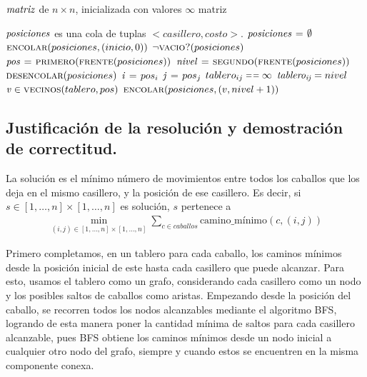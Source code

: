 \vspace*{0.3cm}


\begin{codebox}
\li \Comment $\id{matriz}$ de $n \times n$, inicializada con valores $\infty$
\li \Return matriz
\end{codebox}


\vspace*{0.3cm}


\begin{codebox}
\li \Comment $\id{posiciones}$ es una cola de tuplas $<casillero,costo>$.
\li $\id{posiciones} \gets \emptyset$
\li $\textnormal{\scshape encolar}(posiciones, (inicio,0))$
\li \While $\lnot \textnormal{\scshape vacio?}(posiciones)$ \Do
\li   $\id{pos} \gets \proc{primero}(\proc{frente}(posiciones))$
\li   $\id{nivel} \gets \proc{segundo}(\proc{frente}(posiciones))$
\li   $\textnormal{\scshape desencolar}(posiciones)$
\li   $\id{i} \gets pos_i$
\li   $\id{j} \gets pos_j$
\li   \If $tablero_{ij} \isequal \infty$ \Then
\li     $\id{tablero_{ij}} = nivel$
\li     \For $\id{v} \in \proc{vecinos}(tablero,pos)$ \Do
\li       $\textnormal{\scshape encolar}(posiciones,(v,nivel + 1))$
        \End
      \End
    \End
\end{codebox}



\newpage
\subsection{Justificación de la resolución y demostración de correctitud.}

\vspace*{0.3cm}

La solución es el mínimo número de movimientos entre todos los caballos que
los deja en el mismo casillero, y la posición de ese casillero. Es decir, si
$s \in [1, \dots, n] \times [1, \dots, n]$ es solución, $s$ pertenece a
\begin{align*}
\min_{(i, j) \in [1, \dots, n] \times [1, \dots, n]} \sum_{c \in caballos}
\text{camino\_mínimo}(c, (i, j))
\end{align*}

Primero completamos, en un tablero para cada caballo, los caminos mínimos
desde la posición inicial de este hasta cada casillero que puede alcanzar.
Para esto, usamos el tablero como un grafo, considerando cada casillero como
un nodo y los posibles saltos de caballos como aristas. Empezando desde la
posición del caballo, se recorren todos los nodos alcanzables mediante el
algoritmo BFS, logrando de esta manera poner la cantidad mínima de saltos
para cada casillero alcanzable, pues BFS obtiene los caminos mínimos desde
un nodo inicial a cualquier otro nodo del grafo, siempre y cuando estos se
encuentren en la misma componente conexa.

